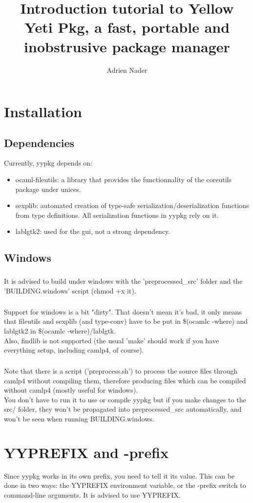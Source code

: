 \documentclass[a4paper]{article}
\author{Adrien Nader}
\title{Introduction tutorial to Yellow Yeti Pkg, a fast, portable and inobstrusive package manager}
\begin{document}
\maketitle

\tableofcontents
\section{Installation}
\subsection{Dependencies}
Currently, yypkg depends on:
\begin{itemize}
  \setlength{\parskip}{0em}
  \item{ocaml-fileutils}: a library that provides the functionnality of the coreutils package under unices.
  \item{sexplib}: automated creation of type-safe serialization/deserialization functions from type definitions. All serialization functions in yypkg rely on it.
  \item{lablgtk2}: used for the gui, not a strong dependency.
\end{itemize}

\subsection{Windows}
\subparagraph{} It is advised to build under windows with the 'preprocessed\_src' folder and the 'BUILDING.windows' script (chmod +x it).

\subparagraph{} Support for windows is a bit "dirty". That doesn't mean it's bad, it only means that fileutils and sexplib (and type-conv) have to be put in \$(ocamlc -where) and lablgtk2 in \$(ocamlc -where)/lablgtk.\\
Also, findlib is not supported (the usual 'make' should work if you have everything setup, including camlp4, of course).

\subparagraph{} Note that there is a script ('preprocess.sh') to process the source files through camlp4 without compiling them, therefore producing files which can be compiled without camlp4 (mostly useful for windows).\\
You don't have to run it to use or compile yypkg but if you make changes to the src/ folder, they won't be propagated into preprocessed\_src automatically, and won't be seen when running BUILDING.windows.

\section{YYPREFIX and -prefix}
Since yypkg works in its own prefix, you need to tell it its value. This can be done in two ways: the YYPREFIX environment variable, or the -prefix switch to command-line arguments. It is advised to use YYPREFIX.
\end{document}
